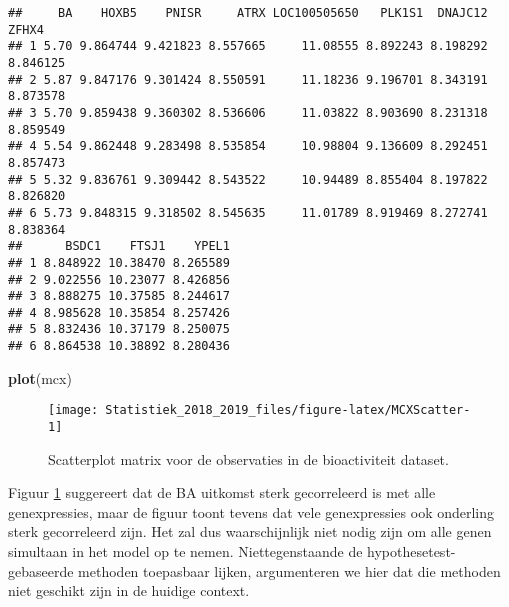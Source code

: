 \documentclass[12pt,dutch,coursenotes]{book}
\newenvironment{Shaded}{\begin{snugshade}}{\end{snugshade}}
\newcommand{\KeywordTok}[1]{\textcolor[rgb]{0.13,0.29,0.53}{\textbf{#1}}}
\newcommand{\NormalTok}[1]{#1}
\theoremstyle{definition}
\theoremstyle{definition}
\theoremstyle{definition}
\theoremstyle{remark}
\begin{document}
\begin{verbatim}
##     BA    HOXB5    PNISR     ATRX LOC100505650   PLK1S1  DNAJC12    ZFHX4
## 1 5.70 9.864744 9.421823 8.557665     11.08555 8.892243 8.198292 8.846125
## 2 5.87 9.847176 9.301424 8.550591     11.18236 9.196701 8.343191 8.873578
## 3 5.70 9.859438 9.360302 8.536606     11.03822 8.903690 8.231318 8.859549
## 4 5.54 9.862448 9.283498 8.535854     10.98804 9.136609 8.292451 8.857473
## 5 5.32 9.836761 9.309442 8.543522     10.94489 8.855404 8.197822 8.826820
## 6 5.73 9.848315 9.318502 8.545635     11.01789 8.919469 8.272741 8.838364
##      BSDC1    FTSJ1    YPEL1
## 1 8.848922 10.38470 8.265589
## 2 9.022556 10.23077 8.426856
## 3 8.888275 10.37585 8.244617
## 4 8.985628 10.35854 8.257426
## 5 8.832436 10.37179 8.250075
## 6 8.864538 10.38892 8.280436
\end{verbatim}

\begin{Shaded}
\begin{Highlighting}[]
\KeywordTok{plot}\NormalTok{(mcx)}
\end{Highlighting}
\end{Shaded}

\begin{figure}

{\centering \texttt{[image: Statistiek\_2018\_2019\_files/figure-latex/MCXScatter-1]} 

}

\caption{Scatterplot matrix voor de observaties in de bioactiviteit dataset.}\label{fig:MCXScatter}
\end{figure}

Figuur \ref{fig:MCXScatter} suggereert dat de BA uitkomst sterk
gecorreleerd is met alle genexpressies, maar de figuur toont tevens dat
vele genexpressies ook onderling sterk gecorreleerd zijn. Het zal dus
waarschijnlijk niet nodig zijn om alle genen simultaan in het model op
te nemen. Niettegenstaande de hypothesetest-gebaseerde methoden
toepasbaar lijken, argumenteren we hier dat die methoden niet geschikt
zijn in de huidige context.
\end{document}
